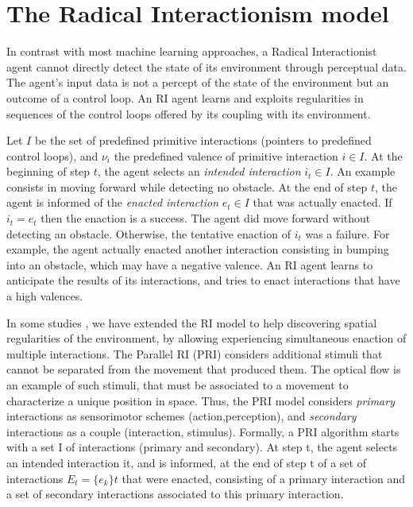\documentclass[conference]{IEEEtran}
\begin{document}
\section{The Radical Interactionism model}


In contrast with most machine learning approaches, a Radical Interactionist agent cannot directly detect the state of its environment through perceptual data. 
The agent's input data is not a percept of the state of the environment but an outcome of a control loop. 
An RI agent learns and exploits regularities in sequences of the control loops offered by its coupling with its environment.  


Let $I$ be the set of predefined primitive interactions (pointers to predefined control loops), and $\nu_i$ the predefined valence of primitive interaction $i \in I$.
At the beginning of step $t$, the agent selects an \textit{intended interaction} $i_t \in I$. 
An example consists in moving forward while detecting no obstacle.
At the end of step $t$, the agent is informed of the \textit{enacted interaction} $e_t \in I$ that was actually enacted. 
If $i_t = e_t$ then the enaction is a success. The agent did move forward without detecting an obstacle. 
Otherwise, the tentative enaction of $i_t$ was a failure. 
For example, the agent actually enacted another interaction consisting in bumping into an obstacle, which may have a negative valence.
An RI agent learns to anticipate the results of its interactions, and tries to enact interactions that have a high valences.

In some studies \cite{}, we have extended the RI model to help discovering spatial regularities of the environment, by allowing experiencing simultaneous enaction of multiple interactions. 
The Parallel RI (PRI) considers additional stimuli that cannot be separated from the movement that produced them. 
The optical flow is an example of such stimuli, that must be associated to a movement to characterize a unique position in space. Thus, the PRI model considers \textit{primary} interactions as sensorimotor schemes (action,perception), and \textit{secondary} interactions as a couple (interaction, stimulus). Formally, a PRI algorithm starts with a set I of interactions (primary and secondary).  At step t, the agent selects an intended interaction it, and is informed, at the end of step t of a set of interactions $E_t=\{e_k\}t$ that were enacted, consisting of a primary interaction and a set of secondary interactions associated to this primary interaction.
\end{document}

